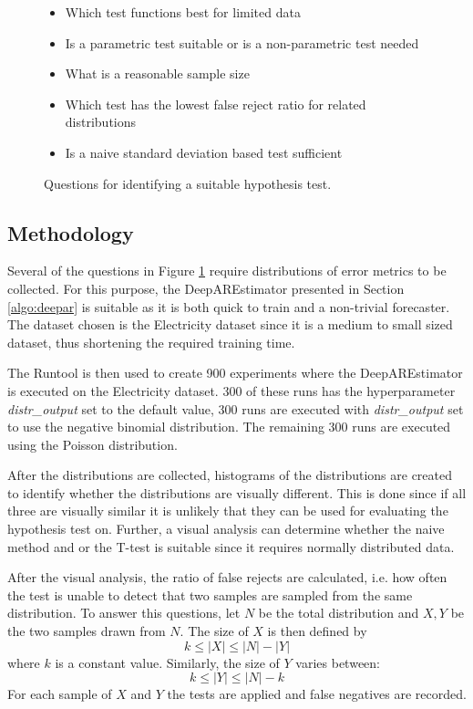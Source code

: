 \begin{figure}
  \begin{itemize}
    \item Which test functions best for limited data
    \item Is a parametric test suitable or is a non-parametric test needed
    \item What is a reasonable sample size
    \item Which test has the lowest false reject ratio for related distributions
    \item Is a naive standard deviation based test sufficient
  \end{itemize}
  \caption{Questions for identifying a suitable hypothesis test.}
  \label{fig:reproducibility_questions}
\end{figure}

\subsection{Methodology}
\label{hypothesis_test_methodology}
Several of the questions in Figure \ref{fig:reproducibility_questions} require distributions of error metrics to be collected. For this purpose, the DeepAREstimator presented in Section \ref{algo:deepar} is suitable as it is both quick to train and a non-trivial forecaster. The dataset chosen is the Electricity dataset since it is a medium to small sized dataset, thus shortening the required training time.

The Runtool is then used to create 900 experiments where the DeepAREstimator is executed on the Electricity dataset. 300 of these runs has the hyperparameter \textit{distr\_output} set to the default value, 300 runs are executed with \textit{distr\_output} set to use the negative binomial distribution. The remaining 300 runs are executed using the Poisson distribution.

After the distributions are collected, histograms of the distributions are created to identify whether the distributions are visually different. This is done since if all three are visually similar it is unlikely that they can be used for evaluating the hypothesis test on. Further, a visual analysis can determine whether the naive method and or the T-test is suitable since it requires normally distributed data.

After the visual analysis, the ratio of false rejects are calculated, i.e. how often the test is unable to detect that two samples are sampled from the same distribution. To answer this questions, let \(N\) be the total distribution and \(X,Y\) be the two samples drawn from \(N\). The size of \(X\) is then defined by \[k \leq |X| \leq |N| - |Y|\] where \(k\) is a constant value. Similarly, the size of \(Y\) varies between: \[k	\leq |Y| \leq |N|-k\] For each sample of \(X\) and \(Y\) the tests are applied and false negatives are recorded.

